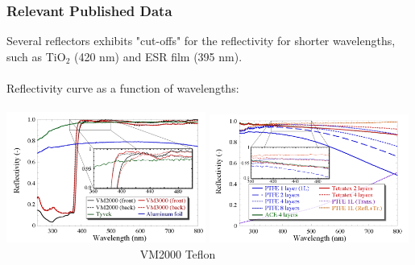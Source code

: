 \documentclass[xcolor=x11names, compress, handout]{beamer}
\renewcommand{\(}{\begin{columns}}
\renewcommand{\)}{\end{columns}}
\newcommand{\<}[1]{\begin{column}{#1}}
\renewcommand{\>}{\end{column}}
\begin{document}
\begin{frame}
\frametitle{Relevant Published Data}
Several reflectors exhibits "cut-offs" for the reflectivity for shorter wavelengths, such as TiO$_2$ (420 nm) and ESR film (395 nm). \cite{janecek_2012} \\
\ \\
Reflectivity curve as a function of wavelengths: \\
\ \\
\includegraphics[width=0.49\textwidth, height=0.45\textheight]{images/vm2000_reflectivity_curve1}
\includegraphics[width=0.49\textwidth, height=0.45\textheight]{images/teflon_reflectivity_curve1}
\scriptsize \flushleft~~~~~~~~~~~~~~~~~~~~~~~ VM2000 \cite{janecek_2012}  \hspace{5cm} Teflon \cite{janecek_2012} \hspace{3cm}
\end{frame}

\end{document}
